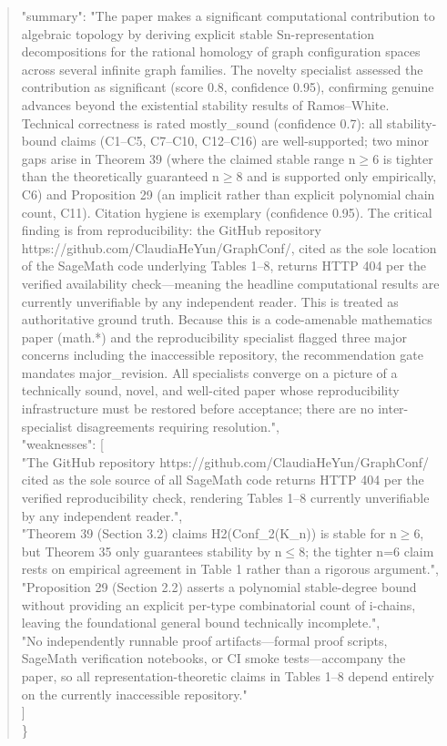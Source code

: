 \documentclass[11pt]{article}
\begin{document}
\begin{quote}
  "summary": "The paper makes a significant computational contribution to algebraic topology by deriving explicit stable Sn-representation decompositions for the rational homology of graph configuration spaces across several infinite graph families. The novelty specialist assessed the contribution as significant (score 0.8, confidence 0.95), confirming genuine advances beyond the existential stability results of Ramos--White. Technical correctness is rated mostly\_sound (confidence 0.7): all stability-bound claims (C1--C5, C7--C10, C12--C16) are well-supported; two minor gaps arise in Theorem 39 (where the claimed stable range n\ensuremath{\ge}6 is tighter than the theoretically guaranteed n\ensuremath{\ge}8 and is supported only empirically, C6) and Proposition 29 (an implicit rather than explicit polynomial chain count, C11). Citation hygiene is exemplary (confidence 0.95). The critical finding is from reproducibility: the GitHub repository https://github.com/ClaudiaHeYun/GraphConf/, cited as the sole location of the SageMath code underlying Tables 1--8, returns HTTP 404 per the verified availability check---meaning the headline computational results are currently unverifiable by any independent reader. This is treated as authoritative ground truth. Because this is a code-amenable mathematics paper (math.*) and the reproducibility specialist flagged three major concerns including the inaccessible repository, the recommendation gate mandates major\_revision. All specialists converge on a picture of a technically sound, novel, and well-cited paper whose reproducibility infrastructure must be restored before acceptance; there are no inter-specialist disagreements requiring resolution.",\\
  "weaknesses": [\\
    "The GitHub repository https://github.com/ClaudiaHeYun/GraphConf/ cited as the sole source of all SageMath code returns HTTP 404 per the verified reproducibility check, rendering Tables 1--8 currently unverifiable by any independent reader.",\\
    "Theorem 39 (Section 3.2) claims H2(Conf\_2(K\_n)) is stable for n\ensuremath{\ge}6, but Theorem 35 only guarantees stability by n\ensuremath{\le}8; the tighter n=6 claim rests on empirical agreement in Table 1 rather than a rigorous argument.",\\
    "Proposition 29 (Section 2.2) asserts a polynomial stable-degree bound without providing an explicit per-type combinatorial count of i-chains, leaving the foundational general bound technically incomplete.",\\
    "No independently runnable proof artifacts---formal proof scripts, SageMath verification notebooks, or CI smoke tests---accompany the paper, so all representation-theoretic claims in Tables 1--8 depend entirely on the currently inaccessible repository."\\
  ]\\
\}\\
\end{quote}
\end{document}
